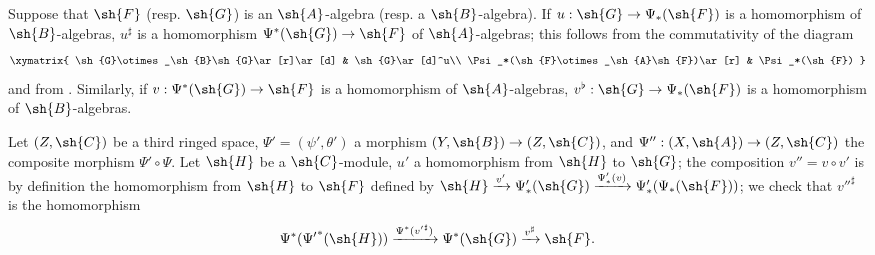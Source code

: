 \begin{env}[4.4.7]
\label{0.4.4.7}
Suppose that $\sh{F}$ (resp. $\sh{G}$) is an $\sh{A}$-algebra (resp. a $\sh{B}$-algebra). If
$u:\sh{G}\to\Psi_*(\sh{F})$ is a homomorphism of $\sh{B}$-algebras, $u^\sharp$ is a
homomorphism $\Psi^*(\sh{G})\to\sh{F}$ of $\sh{A}$-algebras; this follows from the
commutativity of the diagram
\[
  \xymatrix{
    \sh{G}\otimes_\sh{B}\sh{G}\ar[r]\ar[d] &
    \sh{G}\ar[d]^u\\
    \Psi_*(\sh{F}\otimes_\sh{A}\sh{F})\ar[r] &
    \Psi_*(\sh{F})
  }
\]
and from . Similarly, if $v:\Psi^*(\sh{G})\to\sh{F}$ is a homomorphism of
$\sh{A}$-algebras, $v^\flat:\sh{G}\to\Psi_*(\sh{F})$ is a homomorphism of $\sh{B}$-algebras.
\end{env}

\begin{env}[4.4.8]
\label{0.4.4.8}
Let $(Z,\sh{C})$ be a third ringed space, $\Psi'=(\psi',\theta')$ a morphism
$(Y,\sh{B})\to(Z,\sh{C})$, and $\Psi'':(X,\sh{A})\to(Z,\sh{C})$ the composite morphism
$\Psi'\circ\Psi$. Let $\sh{H}$ be a $\sh{C}$-module, $u'$ a homomorphism from $\sh{H}$ to
$\sh{G}$; the composition $v''=v\circ v'$ is by definition the homomorphism from $\sh{H}$ to
$\sh{F}$ defined by
$\sh{H}\xrightarrow{v'}\Psi_*'(\sh{G})\xrightarrow{\Psi_*'(v)}\Psi_*'(\Psi_*(\sh{F}))$; we
check that ${v''}^\sharp$ is the homomorphism
\[
  \Psi^*({\Psi'}^*(\sh{H}))\xrightarrow{\Psi^*({v'}^\sharp)}\Psi^*(\sh{G})
  \xrightarrow{v^\sharp}\sh{F}.
\]
\end{env}

